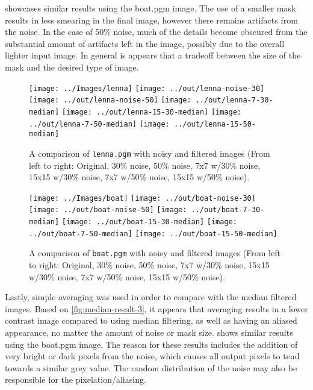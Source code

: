 \documentclass[headings=optiontoheadandtoc,listof=totoc,parskip=full]{scrartcl}
\begin{document}
 showcases similar results using the boat.pgm image. The use of a smaller mask results in less smearing in the final image, however there remains artifacts from the noise. In the case of 50\% noise, much of the details become obscured from the substantial amount of artifacts left in the image, possibly due to the overall lighter input image. In general is appears that a tradeoff between the size of the mask and the desired type of image.


\begin{figure}[H]
	\centering
	\texttt{[image: ../Images/lenna]}
	\texttt{[image: ../out/lenna-noise-30]}
	\texttt{[image: ../out/lenna-noise-50]}
	\texttt{[image: ../out/lenna-7-30-median]}
	\texttt{[image: ../out/lenna-15-30-median]}
	\texttt{[image: ../out/lenna-7-50-median]}
	\texttt{[image: ../out/lenna-15-50-median]}
	\caption{A comparison of \texttt{lenna.pgm} with noisy and filtered images (From left to right: Original, 30\% noise, 50\% noise, 7x7 w/30\% noise, 15x15 w/30\% noise, 7x7 w/50\% noise, 15x15 w/50\% noise).}
	\label{fig:median-result-1}
\end{figure}


\begin{figure}[H]
	\centering
	\texttt{[image: ../Images/boat]}
	\texttt{[image: ../out/boat-noise-30]}
	\texttt{[image: ../out/boat-noise-50]}
	\texttt{[image: ../out/boat-7-30-median]}
	\texttt{[image: ../out/boat-15-30-median]}
	\texttt{[image: ../out/boat-7-50-median]}
	\texttt{[image: ../out/boat-15-50-median]}
	\caption{A comparison of \texttt{boat.pgm} with noisy and filtered images (From left to right: Original, 30\% noise, 50\% noise, 7x7 w/30\% noise, 15x15 w/30\% noise, 7x7 w/50\% noise, 15x15 w/50\% noise).}
	\label{fig:median-result-2}
\end{figure}

Lastly, simple averaging was used in order to compare with the median filtered images. Based on \cref{fig:median-result-3}, it appears that averaging results in a lower contrast image compared to using median filtering, as well as having an aliased appearance, no matter the amount of noise or mask size.  shows similar results using the boat.pgm image. The reason for these results includes the addition of very bright or dark pixels from the noise, which causes all output pixels to tend towards a similar grey value. The random distribution of the noise may also be responsible for the pixelation/aliasing. 
\end{document}
